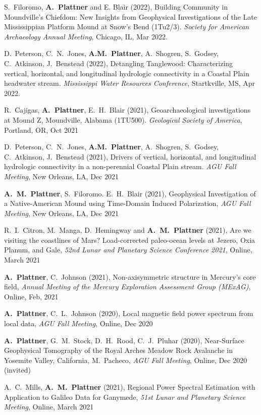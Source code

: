 \documentclass[10pt]{article}
\begin{document}
\spcp S.~Filoromo, \textbf{A.~Plattner} and E. Blair (2022), Building
Community in Moundville's Chiefdom: New Insights from Geophysical
Investigations of the Late Mississippian Platform Mound at Snow's Bend
(1Tu2/3). \emph{Society for American Archaeology Annual Meeting}, Chicago,
IL, Mar 2022.

\spcp D.~Peterson, C.~N.~Jones, \textbf{A.M.~Plattner}, A.~Shogren,
S.~Godsey, C.~Atkinson, J.~Benstead (2022), Detangling Tanglewood:
Characterizing vertical, horizontal, and longitudinal hydrologic
connectivity in a Coastal Plain headwater stream. \emph{Mississippi
Water Resources Conference}, Startkville, MS, Apr 2022.

\spcp R.~Cajigas, \textbf{A.~Plattner}, E.~H.~Blair (2021),
Geoarchaeological investigations at Mound Z, Moundville, Alabama
(1TU500). \emph{Geological Society of America}, Portland, OR, Oct 2021

\spcp D.~Peterson, C.~N.~Jones, \textbf{A.M.~Plattner}, A.~Shogren,
S.~Godsey, C.~Atkinson, J.~Benstead (2021), Drivers of vertical,
horizontal, and longitudinal hydrologic connectivity in a
non-perennial Coastal Plain stream. \emph{AGU Fall Meeting}, New
Orleans, LA, Dec 2021

\spcp \textbf{A.~M.~Plattner}, S.~Filoromo. E.~H.~Blair (2021),
Geophysical Investigation of a Native-American Mound using Time-Domain
Induced Polarization, \emph{AGU Fall Meeting}, New Orleans, LA, Dec
2021

\spcp R.~I.~Citron, M.~Manga, D.~Hemingway and \textbf{A.~M.~Plattner}
(2021), Are we visiting the coastlines of Mars? Load-corrected
paleo-ocean levels at Jezero, Oxia Planum, and Gale, \emph{52nd Lunar
and Planetary Science Conference 2021}, Online, March 2021

\spcp \textbf{A.~Plattner}, C.~Johnson (2021), Non-axisymmetric
structure in Mercury's core field, \emph{Annual Meeting of the Mercury
Exploration Assessment Group (MExAG)}, Online, Feb, 2021

\spcp \textbf{A.~Plattner}, C.~L.~Johnson (2020),
Local magnetic field power spectrum from local data,
\emph{AGU Fall Meeting}, Online, Dec 2020 

\spcp \textbf{A.~Plattner}, G.~M.~Stock, D.~H.~Rood, C.~J.~Pluhar
(2020), Near-Surface Geophysical Tomography of the Royal Arches Meadow
Rock Avalanche in Yosemite Valley, California, M.~Pacheco, \emph{AGU
Fall Meeting}, Online, Dec 2020 (invited)

\spcp A.~C.~Mills, \textbf{A.~M.~Plattner} (2021), Regional Power
Spectral Estimation with Application to Galileo Data for Ganymede,
\emph{51st Lunar and Planetary Science Meeting}, Online, March 2021
\end{document}
